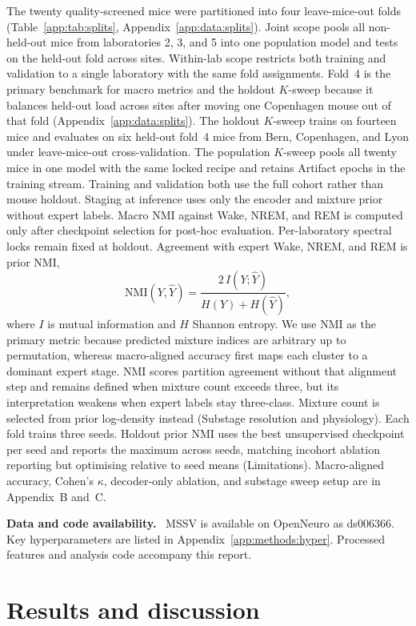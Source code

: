 \documentclass[10pt,letterpaper]{article}
\newcommand{\methodpara}[1]{\par\vspace{0.85em}\noindent\textbf{#1}\ }
\newcommand{\apdx}[1]{Appendix~\ref{#1}}
\newcommand{\papersection}[1]{\section{#1}}
\newcommand{\papersection}[1]{\section*{#1}}
\begin{document}
The twenty quality-screened mice were partitioned into four leave-mice-out folds (Table~\ref{app:tab:splits}, \apdx{app:data:splits}).
Joint scope pools all non-held-out mice from laboratories 2, 3, and 5 into one population model and tests on the held-out fold across sites.
Within-lab scope restricts both training and validation to a single laboratory with the same fold assignments.
Fold~4 is the primary benchmark for macro metrics and the holdout $K$-sweep because it balances held-out load across sites after moving one Copenhagen mouse out of that fold (\apdx{app:data:splits}).
The holdout $K$-sweep trains on fourteen mice and evaluates on six held-out fold~4 mice from Bern, Copenhagen, and Lyon under leave-mice-out cross-validation.
The population $K$-sweep pools all twenty mice in one model with the same locked recipe and retains Artifact epochs in the training stream.
Training and validation both use the full cohort rather than mouse holdout.
Staging at inference uses only the encoder and mixture prior without expert labels.
Macro NMI against Wake, NREM, and REM is computed only after checkpoint selection for post-hoc evaluation.
Per-laboratory spectral locks remain fixed at holdout.
Agreement with expert Wake, NREM, and REM is prior NMI,
\begin{equation}
\label{eq:nmi}
\mathrm{NMI}(Y,\hat{Y}) = \frac{2\,I(Y;\hat{Y})}{H(Y)+H(\hat{Y})},
\end{equation}
where $I$ is mutual information and $H$ Shannon entropy.
We use NMI as the primary metric because predicted mixture indices are arbitrary up to permutation, whereas macro-aligned accuracy first maps each cluster to a dominant expert stage.
NMI scores partition agreement without that alignment step and remains defined when mixture count exceeds three, but its interpretation weakens when expert labels stay three-class. Mixture count is selected from prior log-density instead (Substage resolution and physiology).
Each fold trains three seeds.
Holdout prior NMI uses the best unsupervised checkpoint per seed and reports the maximum across seeds, matching incohort ablation reporting but optimising relative to seed means (Limitations).
Macro-aligned accuracy, Cohen's $\kappa$, decoder-only ablation, and substage sweep setup are in Appendix~B and~C.

\methodpara{Data and code availability.}
MSSV is available on OpenNeuro as ds006366.
Key hyperparameters are listed in \apdx{app:methods:hyper}.
Processed features and analysis code accompany this report.

\papersection{Results and discussion}
\end{document}
